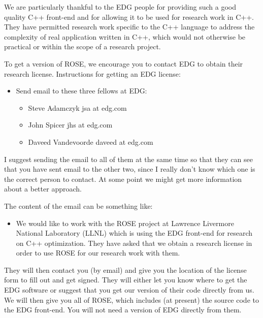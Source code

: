    We are particularly thankful to the EDG people for providing such a
good quality C++ front-end and for allowing it to be used for research work 
in C++.  They have permitted research work specific to the C++ language
to address the complexity of real application written in C++, which would not 
otherwise be practical or within the scope of a research project.

   To get a version of ROSE, we encourage you to contact EDG to obtain their research
license.  Instructions for getting an EDG license:

\begin{itemize}
     \item Send email to these three fellows at EDG:
     \begin{itemize}
          \item Steve Adamczyk       jsa at edg.com
          \item John Spicer          jhs at edg.com
          \item Daveed Vandevoorde   daveed at edg.com
     \end{itemize}
\end{itemize}

I suggest sending the email to all of them at the same time so that they can see that you have
sent email to the other two, since I really don't know which one is the correct person
to contact.  At some point we might get more information about a better approach.

The content of the email can be something like: \\
\begin{itemize}
   \item We would like to work with the ROSE project at Lawrence Livermore 
         National Laboratory (LLNL) which is using the EDG front-end for 
         research on C++ optimization. They have asked that we obtain a 
         research license in order to use ROSE for our research work with them.
\end{itemize}

They will then contact you (by email) and give you the location of the license form
to fill out and get signed.  They will either let you know where to
get the EDG software or suggest that you get our version of their code
directly from us.  We will then give you all of ROSE, which includes (at present)
the source code to the EDG front-end.  You will not need a version of EDG 
directly from them.













